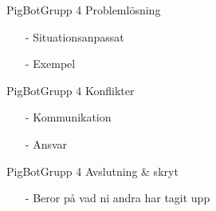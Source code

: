 \begin{frame}[fragile]{PigBot}{Grupp 4}
Problemlösning
  \begin{itemize}
 \pause
    \item[-] Situationsanpassat
\pause
    \item[-] Exempel
  \end{itemize}
\end{frame}

\begin{frame}[fragile]{PigBot}{Grupp 4}
Konflikter
  \begin{itemize}
 \pause
    \item[-] Kommunikation
\pause
    \item[-] Ansvar
  \end{itemize}
\end{frame}

\begin{frame}[fragile]{PigBot}{Grupp 4}
Avslutning \& skryt
  \begin{itemize}
 \pause
    \item[-] Beror på vad ni andra har tagit upp
  \end{itemize}
\end{frame}





